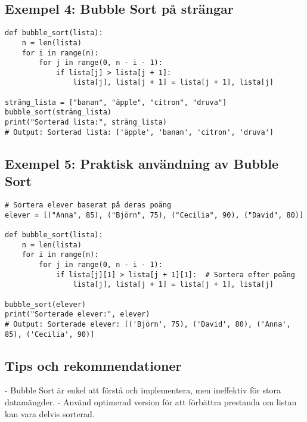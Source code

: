 \subsection*{Exempel 4: Bubble Sort på strängar}

\begin{lstlisting}[title=Bubble Sort - Sortera strängar]
def bubble_sort(lista):
    n = len(lista)
    for i in range(n):
        for j in range(0, n - i - 1):
            if lista[j] > lista[j + 1]:
                lista[j], lista[j + 1] = lista[j + 1], lista[j]

sträng_lista = ["banan", "äpple", "citron", "druva"]
bubble_sort(sträng_lista)
print("Sorterad lista:", sträng_lista)
# Output: Sorterad lista: ['äpple', 'banan', 'citron', 'druva']
\end{lstlisting}

\subsection*{Exempel 5: Praktisk användning av Bubble Sort}

\begin{lstlisting}[title=Bubble Sort - Praktisk användning]
# Sortera elever baserat på deras poäng
elever = [("Anna", 85), ("Björn", 75), ("Cecilia", 90), ("David", 80)]

def bubble_sort(lista):
    n = len(lista)
    for i in range(n):
        for j in range(0, n - i - 1):
            if lista[j][1] > lista[j + 1][1]:  # Sortera efter poäng
                lista[j], lista[j + 1] = lista[j + 1], lista[j]

bubble_sort(elever)
print("Sorterade elever:", elever)
# Output: Sorterade elever: [('Björn', 75), ('David', 80), ('Anna', 85), ('Cecilia', 90)]
\end{lstlisting}

\subsection*{Tips och rekommendationer}
- Bubble Sort är enkel att förstå och implementera, men ineffektiv för stora datamängder.
- Använd optimerad version för att förbättra prestanda om listan kan vara delvis sorterad.
